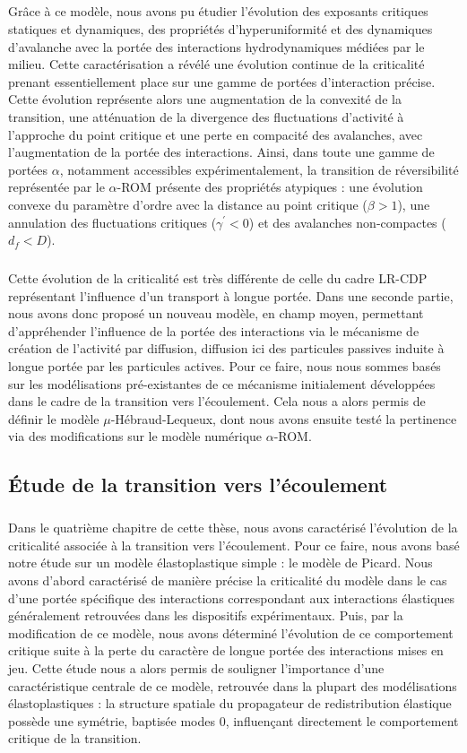 \subparagraph{}Grâce à ce modèle, nous avons pu étudier l'évolution des exposants critiques statiques et dynamiques, des propriétés d'hyperuniformité et des dynamiques d'avalanche avec la portée des interactions hydrodynamiques médiées par le milieu. Cette caractérisation a révélé une évolution continue de la criticalité prenant essentiellement place sur une gamme de portées d'interaction précise. Cette évolution représente alors une augmentation de la convexité de la transition, une atténuation de la divergence des fluctuations d'activité à l'approche du point critique et une perte en compacité des avalanches, avec  l'augmentation de la portée des interactions. Ainsi, dans toute une gamme de portées $\alpha$, notamment accessibles expérimentalement, la transition de réversibilité représentée par le $\alpha$-ROM présente des propriétés atypiques : une évolution convexe du paramètre d'ordre avec la distance au point critique ($\beta > 1$), une annulation des fluctuations critiques ($\gamma^\prime < 0$) et des avalanches non-compactes ($d_f < D$).

\subparagraph{}Cette évolution de la criticalité est très différente de celle du cadre LR-CDP représentant l'influence d'un transport à longue portée. Dans une seconde partie, nous avons donc proposé un nouveau modèle, en champ moyen, permettant d'appréhender l'influence de la portée des interactions via le mécanisme de création de l'activité par diffusion, diffusion ici des particules passives induite à longue portée par les particules actives. Pour ce faire, nous nous sommes basés sur les modélisations pré-existantes de ce mécanisme initialement développées dans le cadre de la transition vers l'écoulement. Cela nous a alors permis de définir le modèle $\mu$-Hébraud-Lequeux, dont nous avons ensuite testé la pertinence via des modifications sur le modèle numérique $\alpha$-ROM.

\subsection*{Étude de la transition vers l'écoulement}

\subparagraph{}Dans le quatrième chapitre de cette thèse, nous avons caractérisé l'évolution de la criticalité associée à la transition vers l'écoulement. Pour ce faire, nous avons basé notre étude sur un modèle élastoplastique simple : le modèle de Picard. Nous avons d'abord caractérisé de manière précise la criticalité du modèle dans le cas d'une portée spécifique des interactions correspondant aux interactions élastiques généralement retrouvées dans les dispositifs expérimentaux. Puis, par la modification de ce modèle, nous avons déterminé l'évolution de ce comportement critique suite à la perte du caractère de longue portée des interactions mises en jeu. Cette étude nous a alors permis de souligner l'importance d'une caractéristique centrale de ce modèle, retrouvée dans la plupart des modélisations élastoplastiques : la structure spatiale du propagateur de redistribution élastique possède une symétrie, baptisée modes 0, influençant directement le comportement critique de la transition. 

